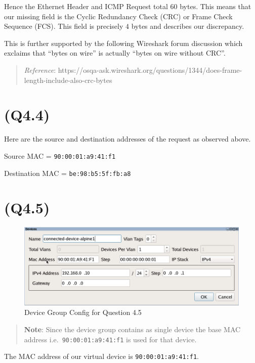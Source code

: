 Hence the Ethernet Header and ICMP Request total \(60\) bytes. This
means that our missing field is the Cyclic Redundancy Check (CRC) or
Frame Check Sequence (FCS). This field is precisely \(4\) bytes and
describes our discrepancy.

This is further supported by the following Wireshark forum discussion
which exclaims that ``bytes on wire'' is actually ``bytes on wire
without CRC''.

\begin{quote}
\emph{Reference}:
https://osqa-ask.wireshark.org/questions/1344/does-frame-length-include-also-crc-bytes
\end{quote}

\hypertarget{q4.4}{%
\section{(Q4.4)}\label{q4.4}}

Here are the source and destination addresses of the request as observed
above.

Source MAC = \texttt{90:00:01:a9:41:f1}

Destination MAC = \texttt{be:98:b5:5f:fb:a8}

\hypertarget{q4.5}{%
\section{(Q4.5)}\label{q4.5}}

\begin{figure}
\centering
\includegraphics{data/q4.5-device-group-config.png}
\caption{Device Group Config for Question 4.5}
\end{figure}

\begin{quote}
\textbf{Note}: Since the device group contains as single device the base
MAC address i.e.~\texttt{90:00:01:a9:41:f1} is used for that device.
\end{quote}

The MAC address of our virtual device is \texttt{90:00:01:a9:41:f1}.

